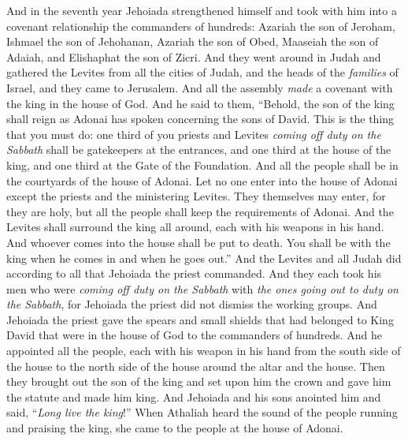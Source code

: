 \begin{biblechapter} %
 And in the seventh year Jehoiada strengthened himself and took with him into a covenant relationship the commanders of hundreds: Azariah the son of Jeroham, Ishmael the son of Jehohanan, Azariah the son of Obed, Maaseiah the son of Adaiah, and Elishaphat the son of Zicri.
\verse And they went around in Judah and gathered the Levites from all the cities of Judah, and the heads of the \textit{families} of Israel, and they came to Jerusalem.
\verse And all the assembly \textit{made} a covenant with the king in the house of God. And he said to them, “Behold, the son of the king shall reign as Adonai has spoken concerning the sons of David.
\verse This is the thing that you must do: one third of you priests and Levites \textit{coming off duty on the Sabbath} shall be gatekeepers at the entrances,
\verse and one third at the house of the king, and one third at the Gate of the Foundation. And all the people shall be in the courtyards of the house of Adonai.
\verse Let no one enter into the house of Adonai except the priests and the ministering Levites. They themselves may enter, for they are holy, but all the people shall keep the requirements of Adonai.
\verse And the Levites shall surround the king all around, each with his weapons in his hand. And whoever comes into the house shall be put to death. You shall be with the king when he comes in and when he goes out.”
\verse And the Levites and all Judah did according to all that Jehoiada the priest commanded. And they each took his men who were \textit{coming off duty on the Sabbath} with \textit{the ones going out to duty on the Sabbath}, for Jehoiada the priest did not dismiss the working groups.
\verse And Jehoiada the priest gave the spears and small shields that had belonged to King David that were in the house of God to the commanders of hundreds.
\verse And he appointed all the people, each with his weapon in his hand from the south side of the house to the north side of the house around the altar and the house.
\verse Then they brought out the son of the king and set upon him the crown and gave him the statute and made him king. And Jehoiada and his sons anointed him and said, “\textit{Long live the king}!”
\verse When Athaliah heard the sound of the people running and praising the king, she came to the people at the house of Adonai.

\end{biblechapter}
